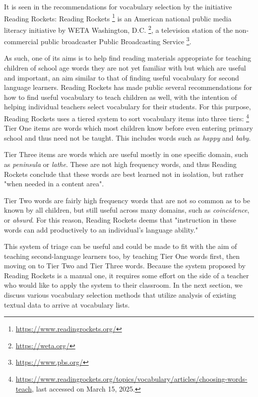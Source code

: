 It is seen in the recommendations for vocabulary selection by the initiative Reading Rockets:
Reading Rockets \footnote{\url{https://www.readingrockets.org/}} is an American national public media literacy initiative by WETA Washington, D.C. \footnote{\url{https://weta.org/}}, a television station of the non-commercial public broadcaster Public Broadcasting Service \footnote{\url{https://www.pbs.org/}}.

As such, one of its aims is to help find reading materials appropriate for teaching children of school age words they are not yet familiar with but which are useful and important, an aim similar to that of finding useful vocabulary for second language learners.
Reading Rockets has made public several recommendations for how to find useful vocabulary to teach children as well, with the intention of helping individual teachers select vocabulary for their students.
For this purpose, Reading Rockets uses a tiered system to sort vocabulary items into three tiers:
\footnote{\label{footnote:reading-rockets-choosing-words-to-teach} \url{https://www.readingrockets.org/topics/vocabulary/articles/choosing-words-teach}, last accessed on March 15, 2025.}
Tier One items are words which most children know before even entering primary school and thus need not be taught.
This includes words such as \textit{happy} and \textit{baby}.

Tier Three items are words which are useful mostly in one specific domain, such as \textit{peninsula} or \textit{lathe}.
These are not high frequency words, and thus Reading Rockets conclude that these words are best learned not in isolation, but rather "when needed in a content area".

Tier Two words are fairly high frequency words that are not so common as to be known by all children, but still useful across many domains, such as \textit{coincidence}, or \textit{absurd}.
For this reason, Reading Rockets deems that "instruction in these words can add productively to an individual’s language ability." 

This system of triage can be useful and could be made to fit with the aim of teaching second-language learners too, by teaching Tier One words first, then moving on to Tier Two and Tier Three words.
Because the system proposed by Reading Rockets is a manual one, it requires some effort on the side of a teacher who would like to apply the system to their classroom.
In the next section, we discuss various vocabulary selection methods that utilize analysis of existing textual data to arrive at vocabulary lists.

